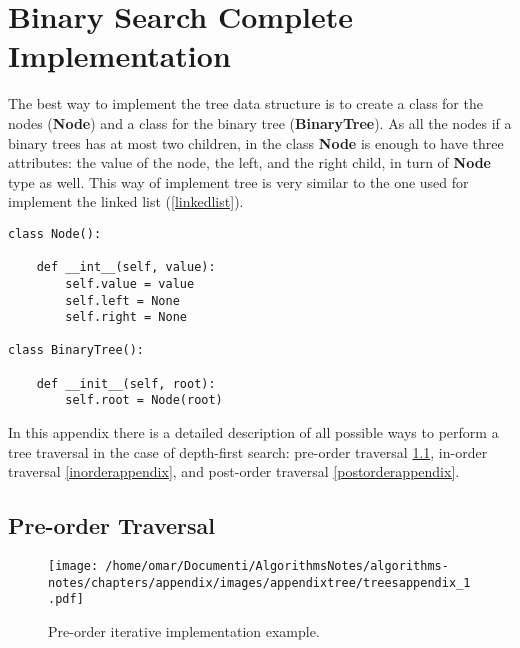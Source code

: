 \chapter{Binary Search Complete Implementation}
\label{binappendix}
The best way to implement the tree data structure is to create a class for the nodes (\textbf{Node}) and a class for the binary tree (\textbf{BinaryTree}). As all the nodes if a binary trees has at most two children, in the class \textbf{Node} is enough to have three attributes: the value of the node, the left, and the right child, in turn of \textbf{Node} type as well. This way of implement tree is very similar to the one used for implement the linked list (\ref{linkedlist}).

\begin{lstlisting}[firstnumber=1, caption={Class definition for a node and a tree.}]
class Node():

	def __int__(self, value):
		self.value = value
		self.left = None
		self.right = None

class BinaryTree():

	def __init__(self, root):
		self.root = Node(root)
\end{lstlisting}

In this appendix there is a detailed description of all possible ways to perform a tree traversal in the case of depth-first search: pre-order traversal \ref{preorderappendix}, in-order traversal \ref{inorderappendix}, and post-order traversal \ref{postorderappendix}.

\section{Pre-order Traversal}
\label{preorderappendix}

\begin{figure}[H]
	\begin{center}
		\texttt{[image: /home/omar/Documenti/AlgorithmsNotes/algorithms-notes/chapters/appendix/images/appendixtree/treesappendix\_1.pdf]}
		\caption[Pre-order iterative implementation example.]{Pre-order iterative implementation example.}
		\label{appendixtrees_1}
	\end{center}
\end{figure}

